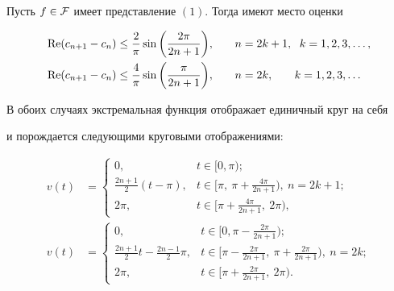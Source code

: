 \begin{thm} 


Пусть $f\in\cal F$ имеет представление $(1)$. Тогда имеют место оценки 


\begin{alignat*}{2} 


\re(c_{n+1}-c_n)&\le\frac{2}{\pi}\sin\bigg(\frac{2\pi}{2n+1}\bigg), 


&\quad n&=2k+1,\ \;k=1,2,3,\dotsc,\\ 


\re(c_{n+1}-c_n)&\le\frac{4}{\pi}\sin\bigg(\frac{\pi}{2n+1}\bigg), 


&\quad n&=2k,\phantom{+1}\ \; k=1,2,3,\dotsc 


\end{alignat*} 


 


В обоих случаях экстремальная функция отображает единичный круг на себя 


и порождается следующими круговыми отображениями: 


\begin{align*} 


v(t)&= 


\begin{cases} 


0, & t\in[0,\pi);\\ 


\frac{2n+1}{2}(t-\pi), & t\in[\pi,\ \pi+\frac{4\pi}{2n+1}), 


\ n=2k+1;\\ 


2\pi, & t\in[\pi+\frac{4\pi}{2n+1},\ 2\pi), 


\end{cases} 


\\ 


v(t)&= 


\begin{cases} 


0, & t\in[0,\pi-\frac{2\pi}{2n+1});\\ 


\frac{2n+1}{2}t-\frac{2n-1}{2}\pi, & t\in[\pi-\frac{2\pi}{2n+1}, 


\ \pi+\frac{2\pi}{2n+1}),\ n=2k; \\ 


2\pi, & t\in[\pi+\frac{2\pi}{2n+1},\ 2\pi). 


\end{cases} 


\end{align*} 


\end{thm} 


